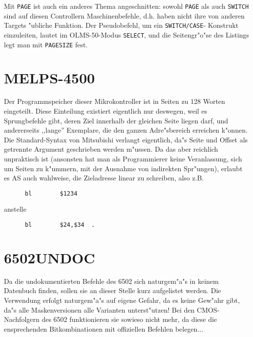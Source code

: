 \documentclass[12pt,a4paper,twoside]{report}
\newcommand{\tty}[1]{{\tt #1}}
\begin{document}
Mit \tty{PAGE} ist auch ein anderes Thema angeschnitten: sowohl
\tty{PAGE} als auch \tty{SWITCH} sind auf diesen Controllern
Maschinenbefehle, d.h. haben nicht ihre von anderen Targets
"ubliche Funktion.  Der Pseudobefehl, um ein \tty{SWITCH/CASE}-
Konstrukt einzuleiten, lautet im OLMS-50-Modus \tty{SELECT}, und
die Seitengr"o"se des Listings legt man mit \tty{PAGESIZE} fest.


\section{MELPS-4500}

Der Programmspeicher dieser Mikrokontroller ist in Seiten zu
128 Worten eingeteilt.  Diese Einteilung existiert eigentlich nur
deswegen, weil es Sprungbefehle gibt, deren Ziel innerhalb der
gleichen Seite liegen darf, und andererseits ,,lange'' Exemplare,
die den ganzen Adre"sbereich erreichen k"onnen.  Die Standard-Syntax
von Mitsubishi verlangt eigentlich, da"s Seite und Offset als getrennte
Argument geschrieben werden m"ussen.  Da das aber reichlich unpraktisch
ist (ansonsten hat man als Programmierer keine Veranlassung, sich um
Seiten zu k"ummern, mit der Ausnahme von indirekten Spr"ungen), erlaubt
es AS auch wahlweise, die Zieladresse linear zu schreiben, also z.B.
\begin{verbatim}
      bl        $1234
\end{verbatim}
anstelle
\begin{verbatim}
      bl        $24,$34  .
\end{verbatim}


\section{6502UNDOC}

Da die undokumentierten Befehle des 6502 sich naturgem"a"s in keinem
Datenbuch finden, sollen sie an dieser Stelle kurz aufgelistet werden.
Die Verwendung erfolgt naturgem"a"s auf eigene Gefahr, da es keine
Gew"ahr gibt, da"s alle Maskenversionen alle Varianten unterst"utzen!
Bei den CMOS-Nachfolgern des 6502 funktionieren sie sowieso nicht
mehr, da diese die ensprechenden Bitkombinationen mit offiziellen Befehlen
belegen...

\clearpage
\end{document}

